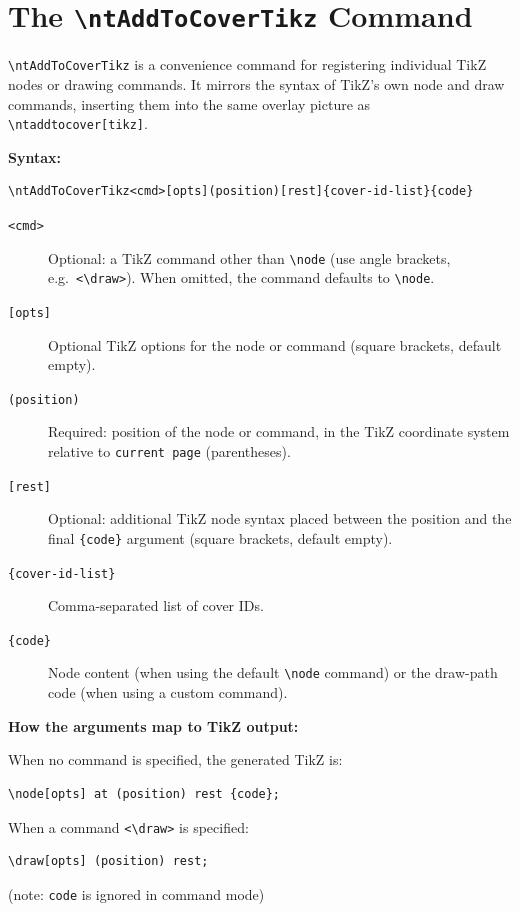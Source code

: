 \section{The \texttt{\textbackslash ntAddToCoverTikz} Command}
\label{sec:ntaddtocovertikz}

\verb!\ntAddToCoverTikz! is a convenience command for registering individual
TikZ nodes or drawing commands.  It mirrors the syntax of TikZ's own node
and draw commands, inserting them into the same overlay picture as
\verb!\ntaddtocover[tikz]!.

\medskip
\noindent\textbf{Syntax:}
\begin{verbatim}
\ntAddToCoverTikz<cmd>[opts](position)[rest]{cover-id-list}{code}
\end{verbatim}

\begin{description}
  \item[\texttt{<cmd>}] Optional: a TikZ command other than \verb!\node!
        (use angle brackets, e.g.\ \verb!<\draw>!).  When omitted, the
        command defaults to \verb!\node!.
  \item[\texttt{[opts]}] Optional TikZ options for the node or command (square
        brackets, default empty).
  \item[\texttt{(position)}] Required: position of the node or command, in
        the TikZ coordinate system relative to \verb!current page! (parentheses).
  \item[\texttt{[rest]}] Optional: additional TikZ node syntax placed between
        the position and the final \verb!{code}! argument (square brackets,
        default empty).
  \item[\texttt{\{cover-id-list\}}] Comma-separated list of cover IDs.
  \item[\texttt{\{code\}}] Node content (when using the default \verb!\node!
        command) or the draw-path code (when using a custom command).
\end{description}

\medskip
\noindent\textbf{How the arguments map to TikZ output:}

When no command is specified, the generated TikZ is:
\begin{verbatim}
\node[opts] at (position) rest {code};
\end{verbatim}

When a command \verb!<\draw>! is specified:
\begin{verbatim}
\draw[opts] (position) rest;
\end{verbatim}
(note: \texttt{code} is ignored in command mode)

